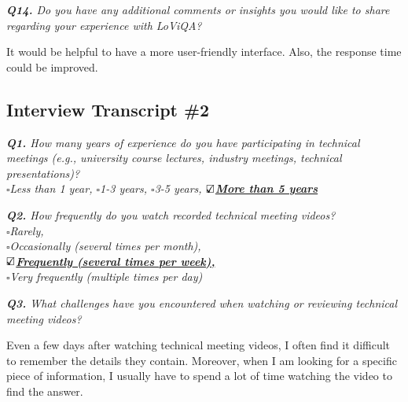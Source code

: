 \vspace*{1em}\noindent\textit{\textbf{Q14.} Do you have any additional comments or insights you would like to share regarding your experience with LoViQA?
}

\begin{samepage}
\begin{mdframed}[style=MyFrame]
It would be helpful to have a more user-friendly interface. Also, the response time could be improved. 
\end{mdframed}
\end{samepage}


\vspace*{.6cm}


\noindent\hrulefill 

\subsection{Interview Transcript \#2}
\label{appendix:transcript2}

\vspace*{.6cm}

\vspace*{1em}\noindent\textit{\textbf{Q1.} How many years of experience do you have participating in technical meetings (e.g., university course lectures, industry meetings, technical presentations)?
\\[.5em]
        \indent $\square$Less than 1 year,
        $\square$1-3 years,
        $\square$3-5 years,
       \underline{\bfseries$\text{\rlap{$\checkmark$}}\square$More than 5 years}
}


\vspace*{1em}\noindent\textit{\textbf{Q2.} How frequently do you watch recorded technical meeting videos?
\\[.5em]
        \indent $\square$Rarely,\\
        \indent$\square$Occasionally (several times per month),\\
        \indent\underline{\bfseries$\text{\rlap{$\checkmark$}}\square$Frequently (several times per week),}\\
        \indent$\square$Very frequently (multiple times per day)
}

\vspace*{1em}\noindent\textit{\textbf{Q3.} What challenges have you encountered when watching or reviewing technical meeting videos? 
}

\begin{samepage}
\begin{mdframed}[style=MyFrame]
Even a few days after watching technical meeting videos, I often find it difficult to remember the details they contain. Moreover, when I am looking for a specific piece of information, I usually have to spend a lot of time watching the video to find the answer.
\end{mdframed}
\end{samepage}

